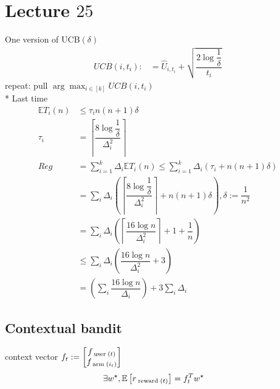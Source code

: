 \documentclass{article}
\begin{document}
\section{Lecture $25$} 
One version of UCB$\left(\delta\right)$
\begin{align*}
UCB\left(i, t_{i}\right)  :&= \hat{U}_{i, t_{i}} + \sqrt{\dfrac{2 \log \dfrac{1}{\delta}}{t_{i}}}
\end{align*}
repeat: pull $\arg\displaystyle\max_{i \in \left[k\right]} UCB\left(i, t_{i}\right) $
\\* Last time
\begin{align*}
\mathbb{E} T_{i}\left(n\right) &\leq  \tau_{i} n \left(n + 1\right) \delta
\\ \tau_{i} &= \left \lceil{\dfrac{8 \log \dfrac{1}{\delta}}{\Delta_{i}^{2}}}\right \rceil
\\ Reg  &= \displaystyle\sum_{i=1}^{k} \Delta_{i} \mathbb{E} T_{i}\left(n\right) \leq  \displaystyle\sum_{i=1}^{k} \Delta_{i} \left(\tau_{i} + n \left(n + 1\right) \delta\right)
\\ &= \displaystyle\sum_{i} \Delta_{i} \left(\left \lceil{\dfrac{8 \log \dfrac{1}{\delta}}{\Delta_{i}^{2}}}\right \rceil + n \left(n + 1\right) \delta\right), \delta := \dfrac{1}{n^{2}}
\\ &= \displaystyle\sum_{i} \Delta_{i} \left(\left \lceil{\dfrac{16 \log n}{\Delta_{i}^{2}}}\right \rceil + 1 + \dfrac{1}{n}\right)
\\ &\leq  \displaystyle\sum_{i} \Delta_{i} \left(\dfrac{16 \log n}{\Delta_{i}^{2}} + 3\right)
\\ &= \left(\displaystyle\sum_{i} \dfrac{16 \log n}{\Delta_{i}}\right) + 3 \displaystyle\sum_{i} \Delta_{i}
\end{align*}

\subsection{Contextual bandit}
context vector $f_{t} := \begin{bmatrix} f_{\text{\;user\;} \left(t\right)} \\ f_{\text{\;arm\;} \left(i_{t}\right)} \end{bmatrix}$
\begin{align*}
\exists w^\star  , \mathbb{E}\left[r_{\text{\;reward\;} \left(t\right)}\right] &= f_{t}^{T} w^\star 
\end{align*}
\end{document}
